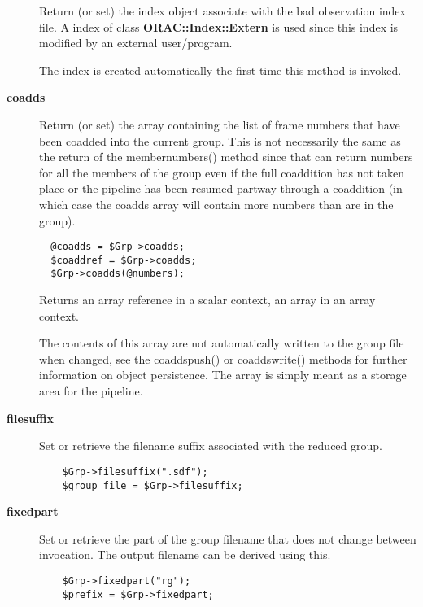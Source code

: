 \begin{description}
Return (or set) the index object associate with the bad observation
index file. A index of class \textbf{ORAC::Index::Extern} is used since
this index is modified by an external user/program.



The index is created automatically the first time this method
is invoked.


\item[{\textbf{coadds}}] \mbox{}

Return (or set) the array containing the list of frame numbers that have
been coadded into the current group. This is not necessarily the same
as the return of the membernumbers() method since that can return numbers
for all the members of the group even if the full coaddition has not
taken place or the pipeline has been resumed partway through a coaddition
(in which case the coadds array will contain more numbers than are in the
group).

\begin{verbatim}
  @coadds = $Grp->coadds;
  $coaddref = $Grp->coadds;
  $Grp->coadds(@numbers);
\end{verbatim}


Returns an array reference in a scalar context, an array in an
array context.



The contents of this array are not automatically written to the
group file when changed, see the coaddspush() or coaddswrite() methods
for further information on object persistence. The array is simply
meant as a storage area for the pipeline.


\item[{\textbf{filesuffix}}] \mbox{}

Set or retrieve the filename suffix associated with the
reduced group.

\begin{verbatim}
    $Grp->filesuffix(".sdf");
    $group_file = $Grp->filesuffix;
\end{verbatim}

\item[{\textbf{fixedpart}}] \mbox{}

Set or retrieve the part of the group filename that does not
change between invocation. The output filename can be derived using
this.

\begin{verbatim}
    $Grp->fixedpart("rg");
    $prefix = $Grp->fixedpart;
\end{verbatim}


\end{description}
